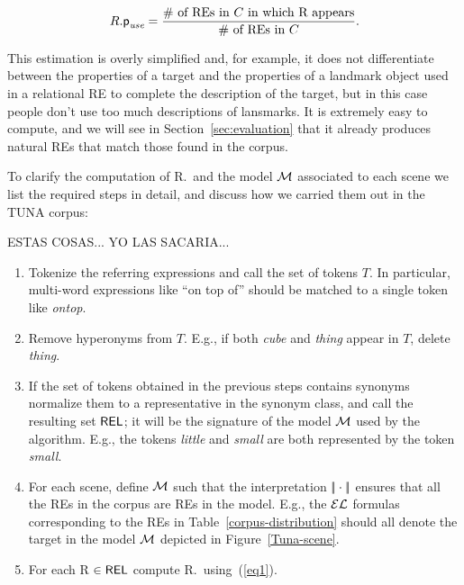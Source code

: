 \begin{equation}\label{eq1}
R.\textsf{p}_\textit{use} = \frac{\# \mbox{ of REs in $C$ in which R appears}}{\# \mbox{ of REs in $C$}}.
\end{equation}

\noindent
This estimation is overly simplified and, for example, it does not differentiate between the properties of a target and the 
properties of a landmark object used in a relational RE to complete the description of the target, but in this case people don't use too much descriptions of lansmarks. It is extremely easy 
to compute, and we will see in Section~\ref{sec:evaluation} that it already produces natural REs that match those found in the corpus. 

To clarify the computation of R.\puse\ and the model $\mathcal{M}$ associated to each scene we list the required steps in detail, 
and discuss how we carried them out in the TUNA corpus:

ESTAS COSAS... YO LAS SACARIA...

\begin{enumerate}
\item Tokenize the referring expressions and call the set of tokens $T$. In particular, multi-word expressions like ``on top of'' 
should be matched to a single token like \emph{ontop}.

\item Remove hyperonyms from $T$. E.g., if both \emph{cube} and \emph{thing} appear in $T$, delete \emph{thing}.

\item If the set of tokens obtained in the previous steps contains synonyms normalize them to a representative in the synonym class, 
and call the resulting set $\textsf{REL}$; it will be the signature of the model $\mathcal{M}$ used by the algorithm. E.g., the tokens \emph{little} 
and \emph{small} are both represented by the token \emph{small}.

\item For each scene, define $\mathcal{M}$ such that the interpretation $|\!|\cdot|\!|$ ensures that all the REs in the corpus are REs in the model.
 E.g., the $\mathcal{EL}$ formulas corresponding to the REs in Table~\ref{corpus-distribution} should all denote the target in the model $\mathcal{M}$ 
depicted in 
Figure~\ref{Tuna-scene}.

\item For each R $\in \textsf{REL}$ compute R.\puse\ using~(\ref{eq1}).\\[-1.9em]

\end{enumerate}

